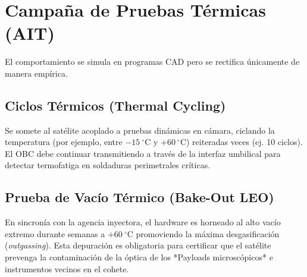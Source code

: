 \section{Campaña de Pruebas Térmicas (AIT)}
El comportamiento se simula en programas CAD pero se rectifica únicamente de manera empírica.

\subsection{Ciclos Térmicos (Thermal Cycling)}
Se somete al satélite acoplado a pruebas dinámicas en cámara, ciclando la temperatura (por ejemplo, entre $-15\ ^\circ\text{C}$ y $+60\ ^\circ\text{C}$) reiteradas veces (ej. 10 ciclos). El OBC debe continuar transmitiendo a través de la interfaz umbilical para detectar termofatiga en soldaduras perimetrales críticas.

\subsection{Prueba de Vacío Térmico (Bake-Out LEO)}
En sincronía con la agencia inyectora, el hardware es horneado al alto vacío extremo durante semanas a $+60\ ^\circ\text{C}$ promoviendo la máxima desgasificación (\textit{outgassing}). Esta depuración es obligatoria para certificar que el satélite prevenga la contaminación de la óptica de los *Payloads microscópicos* e instrumentos vecinos en el cohete.
